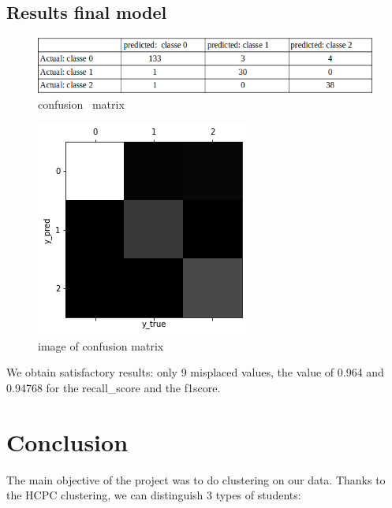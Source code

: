 \documentclass[12pt]{article}
\begin{document}
\subsection{Results final model} 

\begin{figure}[H]
\begin{center}
\includegraphics[scale=0.6]{confusion_matrix_1.png} 
\caption[]{ confusion \ matrix }
\end{center}
\end{figure}



\begin{figure}[H]
\begin{center}
\includegraphics[scale=0.6]{confusion_matrix_2.png} 
\caption[]{ image of confusion matrix  }
\end{center}
\end{figure}

\noindent We obtain satisfactory results: 
only 9 misplaced values, the value of 0.964 and 0.94768 for the recall\_score and the f1\-score.

\section{Conclusion}
The main objective of the project was to do clustering on our data.
Thanks to the HCPC clustering, we can distinguish 3 types of students:
\end{document}
